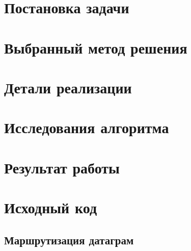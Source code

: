 \documentclass[a4paper,10pt]{article}
\begin{document}


\tableofcontents
\pagebreak


\section{Постановка задачи}

\section{Выбранный метод решения}

\section{Детали реализации}

\section{Исследования алгоритма}

\section{Результат работы}

\pagebreak

\appendix
\section{Исходный код}
\label{appendix:sources}


\subsection{Маршрутизация датаграм}
\label{appendix:sources:datagram}


\pagebreak



\end{document}
